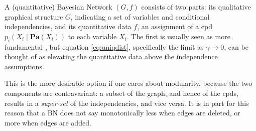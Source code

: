 \documentclass{article}
\theoremstyle{plain}
\theoremstyle{definition}
\theoremstyle{remark}
\newcommand\Pa{\mathbf{Pa}}
\numberwithin{equation}{section}
\begin{document}
		
	A (quantitative) Bayesian Network $(G, f)$ consists of two parts: its qualitative graphical structure $G$, indicating a set of
	variables and
	conditional independencies, and its quantitative data $f$, an assignment of 
	a cpd $p_i(X_i \mid \Pa(X_i))$ to each variable $X_i$.
%
	The first is usually seen as more fundamental%
	, but equation \eqref{eq:uniqdist}, specifically the limit as $\gamma \to 0$, can be thought of as elevating the quantitative data above the independence assumptions. 
\begin{vfull}
	This is the more desirable option if one cares about
	modularity, because the two components are contravariant: a subset of
	the graph, and hence of the cpds, results in a \emph{super-set} of
	the independencies, and vice versa. It is in part for this reason
	that a BN does not say monotonically less when edges are deleted, or
	more when edges are added. 
\end{vfull}
\end{document}
